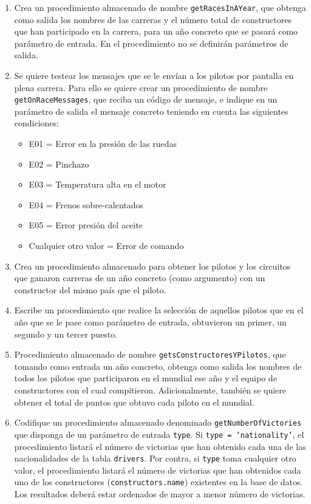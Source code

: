 \documentclass{db-practice}
\begin{document}
\begin{enumerate}
    \item Crea un procedimiento almacenado de nombre \texttt{getRacesInAYear}, que obtenga como salida los nombres de las carreras y el número total de constructores que han participado en la carrera, para un año concreto que se pasará como parámetro de entrada. En el procedimiento no se definirán parámetros de salida.  
        
    \item Se quiere testear los mensajes que se le envían a los pilotos por pantalla en plena carrera. Para ello se quiere crear un procedimiento de nombre \texttt{getOnRaceMessages}, que reciba un código de mensaje, e indique en un parámetro de salida el mensaje concreto teniendo en cuenta las siguientes condiciones:
    \begin{itemize}
        \item E01 = Error en la presión de las ruedas
        \item E02 = Pinchazo
        \item E03 = Temperatura alta en el motor
        \item E04 = Frenos sobre-calentados
        \item E05 = Error presión del aceite
        \item Cualquier otro valor = Error de comando
    \end{itemize} 

    \item Crea un procedimiento almacenado para obtener los pilotos y los circuitos que ganaron carreras de un año concreto (como argumento) con un constructor del mismo país que el piloto.

    \item Escribe un procedimiento que realice la selección de aquellos pilotos que en el año que se le pase como parámetro de entrada, obtuvieron un primer, un segundo y un tercer puesto.
    
    \item Procedimiento almacenado de nombre \texttt{getsConstructoresYPilotos}, que tomando como entrada un año concreto, obtenga como salida los nombres de todos los pilotos que participaron en el mundial ese año y el equipo de constructores con el cual compitieron. Adicionalmente, también se quiere obtener el total de puntos que obtuvo cada piloto en el mundial.

    \item Codifique un procedimiento almacenado denominado \texttt{getNumberOfVictories} que disponga de un parámetro de entrada \texttt{type}. Si \texttt{type = 'nationality'}, el procedimiento listará el número de victorias que han obtenido cada una de las nacionalidades de la tabla \texttt{drivers}. Por contra, si \texttt{type} toma cualquier otro valor, el procedimiento listará el número de victorias que han obtenidos cada uno de los constructores (\texttt{constructors.name}) existentes en la base de datos. Los resultados deberá estar ordenados de mayor a menor número de victorias.
    

\end{enumerate}
\end{document}
